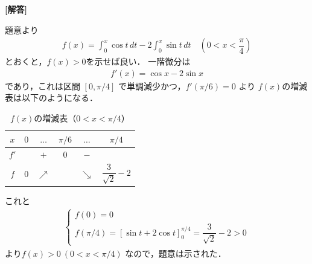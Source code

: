 \documentclass[../../main.tex]{subfiles}
\begin{document}
\begin{oframed}
  
\end{oframed}

{\bf [解答]}

題意より
\begin{align}
  f(x) = \int_0^x \cos t \, dt - 2 \int_0^x \sin t \, dt \quad \left(0 < x < \dfrac{\pi}{4}\right)
\end{align}
とおくと，$f(x)>0$を示せば良い．
一階微分は
\begin{align}
  f'(x) = \cos x - 2 \sin x
\end{align}
であり，これは区間 $[0, \pi/4]$ で単調減少かつ，$f'(\pi/6) = 0$ より
$f(x)$の増減表は以下のようになる．

\begin{center}
  \begin{table}[htb]
    \centering
    \caption{$f(x)$の増減表（$0 < x < \pi/4$）}
    \begin{tabular}{c|ccccc}
      $x$  & $0$ & $\dots$ & $\pi/6$ & $\dots$ & $\pi/4$ \\ \hline
      $f'$ & & $+$ & $0$ & $-$ & \\ \hline
      $f$  & $0$& $\nearrow$ & & $\searrow$ & $\dfrac{3}{\sqrt{2}} - 2$
    \end{tabular}
  \end{table}
\end{center}

これと
\begin{align}
  \begin{cases}
    f(0)=0 \\
    f(\pi/4) = [\sin t + 2 \cos t]_0^{\pi/4} = \dfrac{3}{\sqrt{2}} - 2 > 0
  \end{cases}
\end{align}
より$f(x) > 0 \ (0 < x < \pi/4)$ なので，題意は示された．
\end{document}
